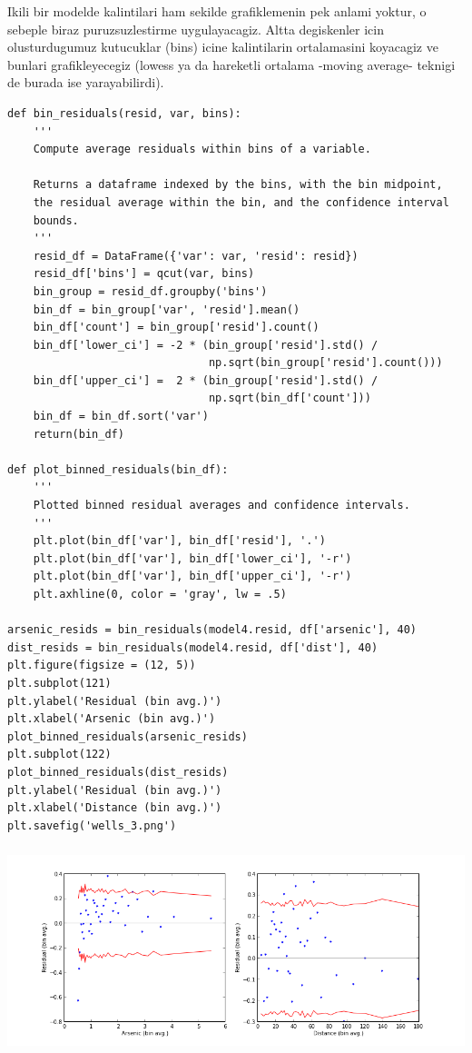 \documentclass[12pt,fleqn]{article}\usepackage{../common}
\begin{document}
Ikili bir modelde kalintilari ham sekilde grafiklemenin pek anlami
yoktur, o sebeple biraz puruzsuzlestirme uygulayacagiz. Altta
degiskenler icin olusturdugumuz kutucuklar (bins) icine kalintilarin
ortalamasini koyacagiz ve bunlari grafikleyecegiz (lowess ya da hareketli
ortalama -moving average- teknigi de burada ise yarayabilirdi). 

\begin{verbatim}
def bin_residuals(resid, var, bins):
    '''
    Compute average residuals within bins of a variable.
    
    Returns a dataframe indexed by the bins, with the bin midpoint,
    the residual average within the bin, and the confidence interval 
    bounds.
    '''
    resid_df = DataFrame({'var': var, 'resid': resid})
    resid_df['bins'] = qcut(var, bins)
    bin_group = resid_df.groupby('bins')
    bin_df = bin_group['var', 'resid'].mean()
    bin_df['count'] = bin_group['resid'].count()
    bin_df['lower_ci'] = -2 * (bin_group['resid'].std() / 
                               np.sqrt(bin_group['resid'].count()))
    bin_df['upper_ci'] =  2 * (bin_group['resid'].std() / 
                               np.sqrt(bin_df['count']))
    bin_df = bin_df.sort('var')
    return(bin_df)

def plot_binned_residuals(bin_df):
    '''
    Plotted binned residual averages and confidence intervals.
    '''
    plt.plot(bin_df['var'], bin_df['resid'], '.')
    plt.plot(bin_df['var'], bin_df['lower_ci'], '-r')
    plt.plot(bin_df['var'], bin_df['upper_ci'], '-r')
    plt.axhline(0, color = 'gray', lw = .5)
    
arsenic_resids = bin_residuals(model4.resid, df['arsenic'], 40)
dist_resids = bin_residuals(model4.resid, df['dist'], 40)
plt.figure(figsize = (12, 5))
plt.subplot(121)
plt.ylabel('Residual (bin avg.)')
plt.xlabel('Arsenic (bin avg.)')
plot_binned_residuals(arsenic_resids)
plt.subplot(122)
plot_binned_residuals(dist_resids)
plt.ylabel('Residual (bin avg.)')
plt.xlabel('Distance (bin avg.)')
plt.savefig('wells_3.png')
\end{verbatim}

\includegraphics[height=6cm]{wells_3.png}
\end{document}
